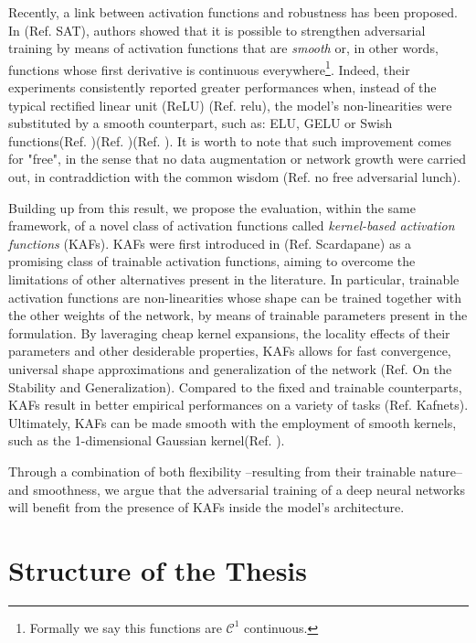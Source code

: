 \documentclass[LaM,binding=0.6cm]{./packages/sapthesis/sapthesis}
\begin{document}
        Recently, a link between activation functions and robustness has been proposed. In (Ref. SAT), authors showed that it is possible to strengthen
        adversarial training by means of activation functions that are \textit{smooth} or, in other words, functions whose first derivative is continuous everywhere\footnote{Formally we say this functions are $\mathcal{C}^1$ continuous.}. 
        Indeed, their experiments consistently reported greater performances when, instead of the 
        typical rectified linear unit (ReLU) (Ref. relu), the model's non-linearities were substituted by a smooth counterpart, such as: ELU, GELU or Swish functions(Ref. )(Ref. )(Ref. ).
        It is worth to note that such improvement comes for "free", in the sense that no data augmentation or network growth were carried out, in contraddiction with 
        the common wisdom (Ref. no free adversarial lunch).
        
        Building up from this result, we propose the evaluation, within the same framework, of a novel class of activation functions called \textit{kernel-based activation functions} (KAFs).
        KAFs were first introduced in (Ref. Scardapane) as a promising class of trainable activation functions, aiming to overcome the limitations of other alternatives present in the literature. 
        In particular, trainable activation functions are non-linearities whose shape can be trained together with the other weights of the network, by means of 
        trainable parameters present in the formulation. By laveraging cheap kernel expansions, the locality effects of their parameters and other desiderable 
        properties, KAFs allows for fast convergence, universal shape approximations and generalization of the network (Ref. On the Stability and Generalization).
        Compared to the fixed and trainable counterparts, KAFs result in better empirical performances on a variety of tasks (Ref. Kafnets). Ultimately,
        KAFs can be made smooth with the employment of smooth kernels, such as the 1-dimensional Gaussian kernel(Ref. ).

        Through a combination of both flexibility --resulting from their trainable nature-- and smoothness, we argue that the adversarial training of a 
        deep neural networks will benefit from the presence of KAFs inside the model's architecture.
        
    \section{Structure of the Thesis}
\end{document}
